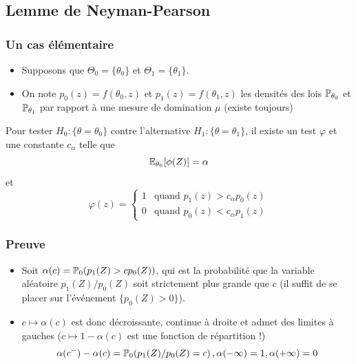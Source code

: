 \subsection{Lemme de Neyman-Pearson}

\begin{frame}
\frametitle{Un cas élémentaire}
\begin{itemize}
\item Supposons que $\Theta_0 = \{\theta_0\}$ et $\Theta_1=\{ \theta_1 \}$.
\item On note $p_0(z)= f(\theta_0,z)$ et $p_1(z)= f(\theta_1,z)$ les densités des lois $\operatorname{{\mathbb P}}_{\theta_0}$ et $\operatorname{{\mathbb P}}_{\theta_1}$ par rapport à une mesure de domination $\mu$ (existe toujours)
\end{itemize}
\begin{theorem}
 Pour tester $H_0: \{\theta = \theta_0\}$ contre l'alternative $H_1 : \{\theta = \theta_1\}$, il existe un test $\varphi$ et une constante $c_\alpha$ telle que
$$
\operatorname{{\mathbb E}}_{\theta_0}[\phi(Z)]= \alpha
$$
et
\[
\varphi(z)=
\begin{cases}
1 & \text{quand $p_1(z) > c_\alpha p_0(z)$} \\
0 & \text{quand $p_0(z) < c_\alpha p_1(z)$}
\end{cases}
\]
\end{theorem}
\end{frame}

\begin{frame}
\frametitle{Preuve}
\begin{itemize}
\item Soit $\alpha(c)= \operatorname{{\mathbb P}}_0( p_1(Z) > c p_0(Z))$, qui est la probabilité que la variable aléatoire $p_1(Z)/p_0(Z)$ soit strictement plus grande que $c$ (il suffit de se placer sur l'événement $\{p_0(Z) > 0 \}$).
\item $c \mapsto \alpha(c)$ est donc décroissante, continue à droite et admet des limites à gauches ($c \mapsto 1 - \alpha(c)$ est une fonction de répartition !)
$$
\alpha(c^-) - \alpha(c) = \operatorname{{\mathbb P}}_0( p_1(Z)/p_0(Z) = c) \,, \alpha(-\infty)= 1, \alpha(+\infty)=0
$$
\end{itemize}
\end{frame}

